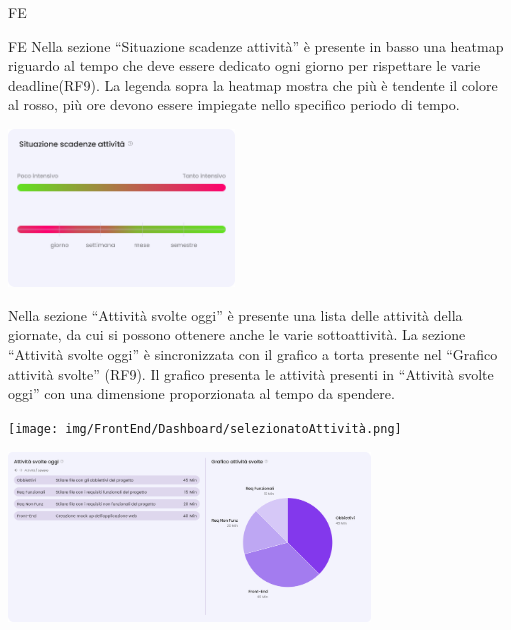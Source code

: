 \begin{listaPersonale}{FE}
\begin{listaPersonale2}{FE}
         Nella sezione “Situazione scadenze attività” è presente in basso una heatmap riguardo al tempo che deve essere dedicato ogni giorno per rispettare le varie deadline(RF9). La legenda sopra la heatmap mostra che più è tendente il colore al rosso, più ore devono essere impiegate nello specifico periodo di tempo.
        \begin{center}
            \includegraphics[width=0.45\textwidth,height=0.18\textheight]{img/FrontEnd/Dashboard/heatMap.png} %
        \end{center}
        
         Nella sezione “Attività svolte oggi” è presente una lista delle attività della giornate, da cui si possono ottenere anche le varie sottoattività. 
        La sezione “Attività svolte oggi” è sincronizzata con il grafico a torta presente nel “Grafico attività svolte” (RF9). Il grafico presenta le attività presenti in “Attività svolte oggi” con una dimensione proporzionata al tempo da spendere.
        \begin{center}
            \texttt{[image: img/FrontEnd/Dashboard/selezionatoAttività.png]} 
        \end{center}
        \begin{center}
            \includegraphics[width=0.72\textwidth,height=0.2\textheight]{img/FrontEnd/Dashboard/Dashboard3.png} %
        \end{center}          
    \end{listaPersonale2}
    

\end{listaPersonale}
